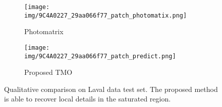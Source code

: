 \documentclass[journal]{IEEEtran}
\begin{document}
\begin{figure*}[t]
\begin{subfigure}[b]{0.24\textwidth}
        \end{subfigure}
        \begin{subfigure}[b]{0.24\textwidth}   
            \centering 
            \texttt{[image: img/9C4A0227\_29aa066f77\_patch\_photomatix.png]}
            \caption[]%
            {{\small Photomatrix \cite{photomatrix} }}    
            \label{fig:mean and std of net34}
        \end{subfigure}
        \begin{subfigure}[b]{0.24\textwidth}   
            \centering 
            \texttt{[image: img/9C4A0227\_29aa066f77\_patch\_predict.png]}
            \caption[]%
            {{\small Proposed TMO}}    
            \label{fig:mean and std of net44}
        \end{subfigure}
        \caption{Qualitative comparison on Laval data test set. The proposed method is able to recover local details in the saturated region.}
        \label{fig:Laval_9C4A0227_29aa066f77}
\end{figure*} 
\end{document}
